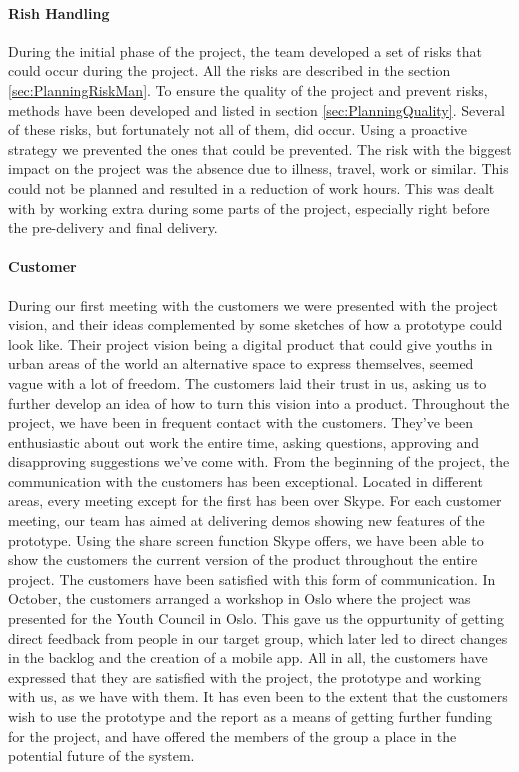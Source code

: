 \paragraph{Rish Handling} During the initial phase of the project, the team developed a set of risks that could occur during the project. All the risks are described in the section \ref{sec:PlanningRiskMan}. To ensure the quality of the project and prevent risks, methods have been developed and listed in section \ref{sec:PlanningQuality}. Several of these risks, but fortunately not all of them, did occur. Using a proactive strategy we prevented the ones that could be prevented. The risk with the biggest impact on the project was the absence due to illness, travel, work or similar. This could not be planned and resulted in a reduction of work hours. This was dealt with by working extra during some parts of the project, especially right before the pre-delivery and final delivery. 
\paragraph{Customer} During our first meeting with the customers we were presented with the project vision, and their ideas complemented by some sketches of how a prototype could look like. Their project vision being a digital product that could give youths in urban areas of the world an alternative space to express themselves, seemed vague with a lot of freedom. The customers laid their trust in us, asking us to further develop an idea of how to turn this vision into a product. Throughout the project, we have been in frequent contact with the customers. They’ve been enthusiastic about out work the entire time, asking questions, approving and disapproving suggestions we’ve come with. From the beginning of the project, the communication with the customers has been exceptional. Located in different areas, every meeting except for the first has been over Skype. For each customer meeting, our team has aimed at delivering demos showing new features of the prototype. Using the share screen function Skype offers, we have been able to show the customers the current version of the product throughout the entire project. The customers have been satisfied with this form of communication. In October, the customers arranged a workshop in Oslo where the project was presented for the Youth Council in Oslo. This gave us the oppurtunity of getting direct feedback from people in our target group, which later led to direct changes in the backlog and the creation of a mobile app. All in all, the customers have expressed that they are satisfied with the project, the prototype and working with us, as we have with them. It has even been to the extent that the customers wish to use the prototype and the report as a means of getting further funding for the project, and have offered the members of the group a place in the potential future of the system.
